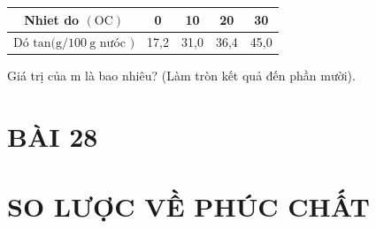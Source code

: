 \documentclass[10pt]{article}
\begin{document}
\begin{center}
\begin{tabular}{|c|c|c|c|c|}
\hline
Nhiet do $(\mathrm{OC})$ & 0 & 10 & 20 & 30 \\
\hline
Dó $\mathrm{tan}(\mathrm{g} / 100 \mathrm{~g}$ nưóc $)$ & 17,2 & 31,0 & 36,4 & 45,0 \\
\hline
\end{tabular}
\end{center}

Giá trị của m là bao nhiêu? (Làm tròn kết quả đến phần mười).

\section*{BÀI 28}
\section*{SO LƯỢC VỀ PHÚC CHẤT}
\end{document}
